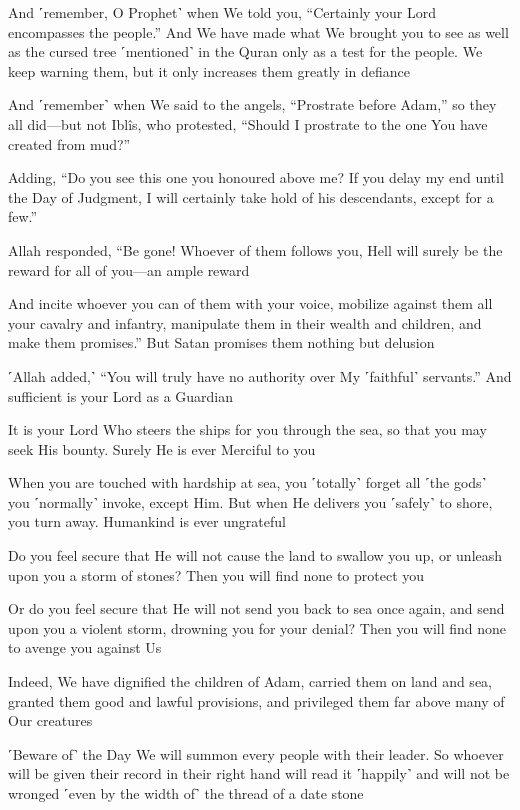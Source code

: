 And ˹remember, O Prophet˺ when We told you, “Certainly your Lord encompasses the people.” And We have made what We brought you to see as well as the cursed tree ˹mentioned˺ in the Quran only as a test for the people. We keep warning them, but it only increases them greatly in defiance

And ˹remember˺ when We said to the angels, “Prostrate before Adam,” so they all did—but not Iblîs, who protested, “Should I prostrate to the one You have created from mud?”

Adding, “Do you see this one you honoured above me? If you delay my end until the Day of Judgment, I will certainly take hold of his descendants, except for a few.”

Allah responded, “Be gone! Whoever of them follows you, Hell will surely be the reward for all of you—an ample reward

And incite whoever you can of them with your voice, mobilize against them all your cavalry and infantry, manipulate them in their wealth and children, and make them promises.” But Satan promises them nothing but delusion

˹Allah added,˺ “You will truly have no authority over My ˹faithful˺ servants.” And sufficient is your Lord as a Guardian

It is your Lord Who steers the ships for you through the sea, so that you may seek His bounty. Surely He is ever Merciful to you

When you are touched with hardship at sea, you ˹totally˺ forget all ˹the gods˺ you ˹normally˺ invoke, except Him. But when He delivers you ˹safely˺ to shore, you turn away. Humankind is ever ungrateful

Do you feel secure that He will not cause the land to swallow you up, or unleash upon you a storm of stones? Then you will find none to protect you

Or do you feel secure that He will not send you back to sea once again, and send upon you a violent storm, drowning you for your denial? Then you will find none to avenge you against Us

Indeed, We have dignified the children of Adam, carried them on land and sea, granted them good and lawful provisions, and privileged them far above many of Our creatures

˹Beware of˺ the Day We will summon every people with their leader. So whoever will be given their record in their right hand will read it ˹happily˺ and will not be wronged ˹even by the width of˺ the thread of a date stone

